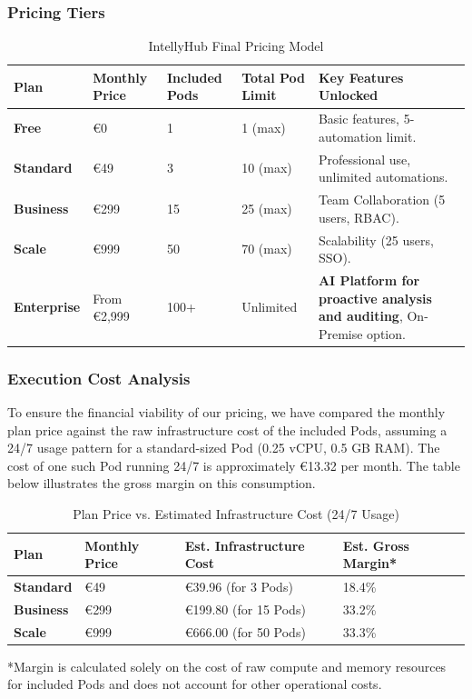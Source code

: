\documentclass[11pt, a4paper, oneside]{article}
\begin{document}
\subsubsection{Pricing Tiers}

\begin{table}[H]
\centering
\caption{IntellyHub Final Pricing Model}
\label{tab:final_pricing_model}
\begin{tabularx}{\textwidth}{l L L L L} 
\toprule
\textbf{Plan} & \textbf{Monthly Price} & \textbf{Included Pods} & \textbf{Total Pod Limit} & \textbf{Key Features Unlocked} \\
\midrule
\textbf{Free} & \euro{0} & 1 & 1 (max) & Basic features, 5-automation limit. \\
\addlinespace
\textbf{Standard} & \euro{49} & 3 & 10 (max) & Professional use, unlimited automations. \\
\addlinespace
\textbf{Business} & \euro{299} & 15 & 25 (max) & Team Collaboration (5 users, RBAC). \\
\addlinespace
\textbf{Scale} & \euro{999} & 50 & 70 (max) & Scalability (25 users, SSO). \\
\addlinespace
\textbf{Enterprise} & From \euro{2,999} & 100+ & Unlimited & \textbf{AI Platform for proactive analysis and auditing}, On-Premise option. \\
\bottomrule
\end{tabularx}
\end{table}

\subsubsection{Execution Cost Analysis}

To ensure the financial viability of our pricing, we have compared the monthly plan price against the raw infrastructure cost of the included Pods, assuming a 24/7 usage pattern for a standard-sized Pod (0.25 vCPU, 0.5 GB RAM). The cost of one such Pod running 24/7 is approximately \euro{13.32 per month}. The table below illustrates the gross margin on this consumption.

\begin{table}[H]
\centering
\caption{Plan Price vs. Estimated Infrastructure Cost (24/7 Usage)}
\label{tab:cost_analysis}
\begin{tabularx}{\textwidth}{L X X X} 
\toprule
\textbf{Plan} & \textbf{Monthly Price} & \textbf{Est. Infrastructure Cost} & \textbf{Est. Gross Margin*} \\
\midrule
\textbf{Standard} & \euro{49} & \euro{39.96} (for 3 Pods) & 18.4\% \\
\addlinespace
\textbf{Business} & \euro{299} & \euro{199.80} (for 15 Pods) & 33.2\% \\
\addlinespace
\textbf{Scale} & \euro{999} & \euro{666.00} (for 50 Pods) & 33.3\% \\
\bottomrule
\end{tabularx}
\raggedright
\footnotesize{*Margin is calculated solely on the cost of raw compute and memory resources for included Pods and does not account for other operational costs.}
\end{table}
\end{document}
